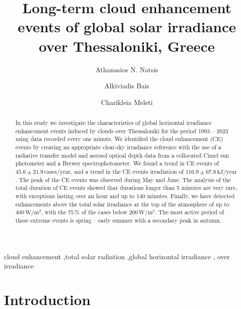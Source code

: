 \documentclass[preprint, 5p,
authoryear]{elsarticle} %
\begin{document}
\begin{frontmatter}

  \title{Long-term cloud enhancement events of global solar irradiance
over Thessaloniki, Greece}
    \author[LAP]{Athanasios N. Natsis%
  }
    \author[LAP]{Alkiviadis Bais%
  }
    \author[LAP]{Charikleia Meleti%
  }

  \begin{abstract}
  In this study we investigate the characteristics of global horizontal
  irradiance enhancement events induced by clouds over Thessaloniki for
  the period 1993 -- 2023 using data recorded every one minute. We
  identified the cloud enhancement (CE) events by creating an
  appropriate clear-sky irradiance reference with the use of a radiative
  transfer model and aerosol optical depth data from a collocated Cimel
  sun photometer and a Brewer spectrophotometer. We found a trend in CE
  events of \(45.6\pm 21.9\,\text{cases}/\text{year}\), and a trend in
  the CE events irradiation of \(116.9\pm 67.8\,\text{kJ}/\text{year}\).
  The peak of the CE events was observed during May and June. The
  analysis of the total duration of CE events showed that durations
  longer than 5 minutes are very rare, with exceptions lasting over an
  hour and up to 140 minutes. Finally, we have detected enhancements
  above the total solar irradiance at the top of the atmosphere of up to
  \(400\,\text{W}/\text{m}^{2}\), with the \(75\,\%\) of the cases below
  \(200\,\text{W}/\text{m}^{2}\). The most active period of these
  extreme events is spring -- early summer with a secondary peak in
  autumn.
  \end{abstract}
    \begin{keyword}
    cloud enhancement \sep total solar radiation \sep global horizontal
irradiance \sep 
    over irradiance
  \end{keyword}

 \end{frontmatter}

\hypertarget{introduction}{%
\section{Introduction}\label{introduction}}
\end{document}
